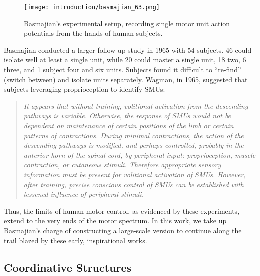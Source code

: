 \documentclass[../main.tex]{subfiles}
\begin{document}
%
\begin{figure}[!htb]
  \centering
  \texttt{[image: introduction/basmajian\_63.png]}
  \caption[Basmajian experimental method]{Basmajian's experimental setup, recording single motor unit action potentials from the hands of human subjects.}\label{fig:basmajian_63}
\end{figure}
%
Basmajian conducted a larger follow-up study in 1965 with 54 subjects. 46 could isolate well at least a single unit, while 20 could master a single unit, 18 two, 6 three, and 1 subject four and six units\cite{Basmajian1965}. Subjects found it difficult to ``re-find'' (switch between) and isolate units separately. Wagman, in 1965, suggested that subjects leveraging proprioception to identify SMUs:
%
\begin{quotation}
\noindent\itshape{It appears that without training, volitional activation from the descending pathways is variable. Otherwise, the response of SMUs would not be dependent on maintenance of certain positions of the limb or certain patterns of contractions. During minimal contractions, the action of the descending pathways is modified, and perhaps controlled, probably in the anterior horn of the spinal cord, by peripheral input: proprioception, muscle contraction, or cutaneous stimuli. Therefore appropriate sensory information must be present for volitional activation of SMUs. However, after training, precise conscious control of SMUs can be established with lessened influence of peripheral stimuli.\cite{Wagman1965}}
\end{quotation}
%
Thus, the limits of human motor control, as evidenced by these experiments, extend to the very ends of the motor spectrum. In this work, we take up Basmajian's charge of constructing a large-scale version to continue along the trail blazed by these early, inspirational works.

















\subsection{Coordinative Structures}\label{coordinative-structures}
\end{document}
